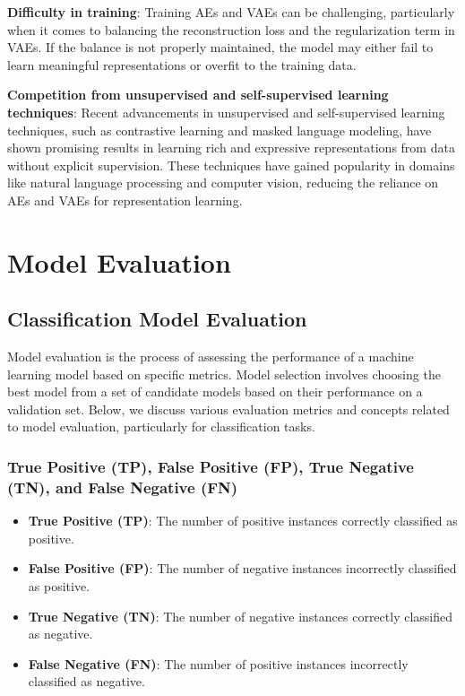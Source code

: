 \documentclass[12pt]{article}
\begin{document}
\textbf{Difficulty in training}: Training AEs and VAEs can be challenging, particularly when it comes to balancing the reconstruction loss and the regularization term in VAEs. If the balance is not properly maintained, the model may either fail to learn meaningful representations or overfit to the training data.

\textbf{Competition from unsupervised and self-supervised learning techniques}: Recent advancements in unsupervised and self-supervised learning techniques, such as contrastive learning and masked language modeling, have shown promising results in learning rich and expressive representations from data without explicit supervision. These techniques have gained popularity in domains like natural language processing and computer vision, reducing the reliance on AEs and VAEs for representation learning.

\section{Model Evaluation}

\subsection{Classification Model Evaluation}
Model evaluation is the process of assessing the performance of a machine learning model based on specific metrics. Model selection involves choosing the best model from a set of candidate models based on their performance on a validation set. Below, we discuss various evaluation metrics and concepts related to model evaluation, particularly for classification tasks.

\subsubsection{True Positive (TP), False Positive (FP), True Negative (TN), and False Negative (FN)}

\begin{itemize}
\item \textbf{True Positive (TP)}: The number of positive instances correctly classified as positive.
\item \textbf{False Positive (FP)}: The number of negative instances incorrectly classified as positive.
\item \textbf{True Negative (TN)}: The number of negative instances correctly classified as negative.
\item \textbf{False Negative (FN)}: The number of positive instances incorrectly classified as negative.
\end{itemize}
\end{document}
